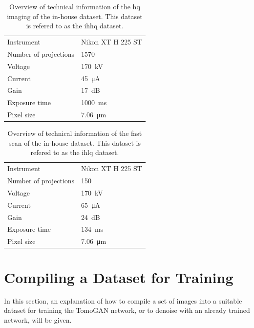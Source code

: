 \begin{table}[htbp]
    \centering
    \caption[Technical information of the IHHQ dataset]{Overview of technical information of the \acrlong{hq} imaging of the in-house dataset. This dataset is refered to as the \gls{ihhq} dataset. }
    \label{tab:inhousehq}
    \begin{tabular}{ll}
    \hline
    Instrument & Nikon XT H 225 ST \\
    Number of projections & 1570 \\
    Voltage & \SI{170}{\kilo \volt}\\
    Current & \SI{45}{\micro \ampere}\\
    Gain & \SI{17}{\deci \bel}\\
    Exposure time & \SI{1000}{\milli \second}\\
    Pixel size & \SI{7.06}{\micro \meter} \\
    \hline
    \end{tabular}
\end{table}

\begin{table}[htbp]
    \centering
    \caption[Technical information of the IHLQ dataset]{Overview of technical information of the fast scan of the in-house dataset. This dataset is refered to as the \gls{ihlq} dataset. }
    \label{tab:inhouselq}
    \begin{tabular}{ll}
    \hline
    Instrument & Nikon XT H 225 ST \\
    Number of projections & 150 \\
    Voltage & \SI{170}{\kilo \volt}\\
    Current & \SI{65}{\micro \ampere}\\
    Gain & \SI{24}{\deci \bel}\\
    Exposure time & \SI{134}{\milli \second}\\
    Pixel size & \SI{7.06}{\micro \meter} \\
    \hline
    \end{tabular}
\end{table}

\section{Compiling a Dataset for Training}
\label{sec:method:compilingdataset}
In this section, an explanation of how to compile a set of images into a suitable dataset for training the TomoGAN network, or to denoise with an already trained network, will be given. 

